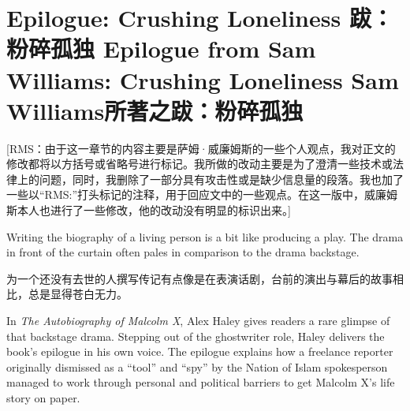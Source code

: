 

\chapter{\ifdefined\vone\ifdefined\eng
Epilogue: Crushing Loneliness
\fi
\ifdefined\chs
跋：粉碎孤独 
\fi\fi\ifdefined\vtwo\ifdefined\eng
Epilogue from Sam Williams: Crushing Loneliness
\fi
\ifdefined\chs
Sam Williams所著之跋：粉碎孤独
\fi\fi}
\ifdefined\eng
{}
\fi
\thispagestyle{empty}

\ifdefined\vtwo
\ifdefined{}
\fi

\ifdefined\chs
[RMS：由于这一章节的内容主要是萨姆·威廉姆斯的一些个人观点，我对正文的修改都将以方括号或省略号进行标记。我所做的改动主要是为了澄清一些技术或法律上的问题，同时，我删除了一部分具有攻击性或是缺少信息量的段落。我也加了一些以``RMS:''打头标记的注释，用于回应文中的一些观点。在这一版中，威廉姆斯本人也进行了一些修改，他的改动没有明显的标识出来。]
\fi
\fi

\ifdefined\eng
Writing the biography of a living person is a bit like producing a play. The drama in front of the curtain often pales in comparison to the drama backstage.
\fi

\ifdefined\chs
为一个还没有去世的人撰写传记有点像是在表演话剧，台前的演出与幕后的故事相比，总是显得苍白无力。
\fi

\ifdefined\eng
In \textit{The Autobiography of Malcolm X}, Alex Haley gives readers a rare glimpse of that backstage drama. Stepping out of the ghostwriter role, Haley delivers the book's epilogue in his own voice. The epilogue explains how a freelance reporter originally dismissed as a ``tool'' and ``spy'' by the Nation of Islam spokesperson managed to work through personal and political barriers to get Malcolm X's life story on paper.
\fi

